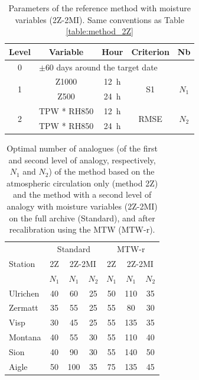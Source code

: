 \documentclass[hess, manuscript]{copernicus}
\begin{document}
	\begin{table}[htb]
		\caption{Parameters of the reference method with moisture variables (2Z-2MI). Same conventions as Table \ref{table:method_2Z}}
		\footnotesize
		\begin{center}
			\begin{tabular}{ccccc}
				\hline 
				Level & Variable & Hour & Criterion & Nb \\ 
				\hline 
				0 & \multicolumn{4}{l}{$\pm 60$ days around the target date} \\
				\hline 
				\multirow{2}{*}{1} & Z1000 & 12~h & \multirow{2}{*}{S1} & \multirow{2}{*}{$N_{1}$} \\
				& Z500 & 24~h & & \\ 
				\hline
				\multirow{2}{*}{2} & TPW * RH850 & 12~h & \multirow{2}{*}{RMSE} & \multirow{2}{*}{$N_{2}$} \\
				& TPW * RH850 & 24~h & & \\ 
				\hline 
			\end{tabular} 
		\end{center}
		\label{table:method_2Z-2MI}
	\end{table}
	
	\begin{table}[htb]
		\caption{Optimal number of analogues (of the first and second level of analogy, respectively, $N_{1}$ and $N_{2}$) of the method based on the atmospheric circulation only (method 2Z) and the method with a second level of analogy with moisture variables (2Z-2MI) on the full archive (Standard), and after recalibration using the MTW (MTW-r).}
		\begin{center}
			\begin{tabular}{l c c c c c c }
				\hline
				\multirow{3}{*}{Station} & \multicolumn{3}{c}{Standard} & \multicolumn{3}{c}{MTW-r} \\
				& 2Z & \multicolumn{2}{c}{2Z-2MI} & 2Z & \multicolumn{2}{c}{2Z-2MI}\\
				& $N_{1}$ & $N_{1}$ & $N_{2}$ & $N_{1}$ & $N_{1}$ & $N_{2}$\\ 
				\hline
				Ulrichen & 40 & 60 & 25 & 50 & 110 & 35\\
				Zermatt & 35 & 55 & 25 & 55 & 80 & 30\\
				Visp & 30 & 45 & 25 & 55 & 135 & 35\\
				Montana & 40 & 55 & 30 & 55 & 110 & 40\\
				Sion & 40 & 90 & 30 & 55 & 140 & 50\\
				Aigle & 50 & 100 & 35 & 75 & 135 & 45\\ 
				\hline
			\end{tabular}
		\end{center}	
		\label{table:analog_nb}
	\end{table}
	
\end{document}

